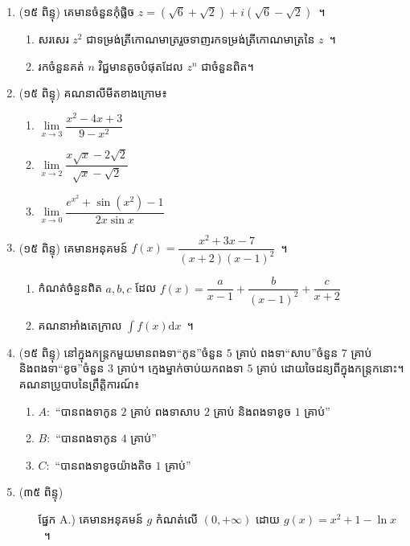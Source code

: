 \documentclass[12pt,a4paper]{article}
\begin{document}
\begin{enumerate}
	\item (១៥ ពិន្ទុ) គេមានចំនួនកុំផ្លិច $ z=(\sqrt{6}+\sqrt{2})+i(\sqrt{6}-\sqrt{2}) $~។
	\begin{enumerate}
		\item សរសេរ $ z^2 $ ជាទម្រង់ត្រីកោណមាត្ររួចទាញរកទម្រង់ត្រីកោណមាត្រនៃ $ z $~។
		\item រកចំនួនគត់ $ n $ វិជ្ជមានតូចបំផុតដែល $ z^n $ ជាចំនួនពិត។
	\end{enumerate}
	\item (១៥ ពិន្ទុ) គណនាលីមីតខាងក្រោម៖
	\begin{multicols}{3}
		\begin{enumerate}
			\item $ \lim\limits_{x\to 3}\dfrac{x^2-4x+3}{9-x^2} $
			\item $ \lim\limits_{x\to 2}\dfrac{x\sqrt{x}-2\sqrt{2}}{\sqrt{x}-\sqrt{2}} $
			\item $ \lim\limits_{x\to 0}\dfrac{e^{x^2}+\sin (x^2)-1}{2x\sin x} $
		\end{enumerate}
	\end{multicols}
	\item (១៥ ពិន្ទុ) គេមានអនុគមន៍ $ f(x)=\dfrac{x^2+3x-7}{(x+2)(x-1)^2} $~។
	\begin{enumerate}
		\item កំណត់ចំនួនពិត $ a,b,c $ ដែល $ f(x)=\dfrac{a}{x-1}+\dfrac{b}{(x-1)^2}+\dfrac{c}{x+2} $
		\item គណនាអាំងតេក្រាល $ \displaystyle\int f(x)\mathrm{d}x $~។
	\end{enumerate}
	\item (១៥ ពិន្ទុ) នៅក្នុងកន្ត្រកមួយមានពងទា``កូន''ចំនួន $ 5 $ គ្រាប់ ពងទា``សាប''ចំនួន $ 7 $ គ្រាប់ និងពងទា``ខូច''ចំនួន $ 3 $ គ្រាប់។ ក្មេងម្នាក់ចាប់យកពងទា $ 5 $ គ្រាប់ ដោយចៃដន្យពីក្នុងកន្ត្រកនោះ។\\
	គណនាប្រូបាបនៃព្រឹត្តិការណ៍៖
	\begin{enumerate}
		\item $ A: $ ``បានពងទាកូន $ 2 $ គ្រាប់ ពងទាសាប $ 2 $ គ្រាប់ និងពងទាខូច $ 1 $ គ្រាប់''
		\item $ B: $ ``បានពងទាកូន $ 4 $ គ្រាប់''
		\item $ C: $ ``បានពងទាខូចយ៉ាងតិច $ 1 $ គ្រាប់''
	\end{enumerate}
	\item (៣៥ ពិន្ទុ) 
	\begin{itemize}
		\item[ផ្នែក A.)] គេមានអនុគមន៍ $ g $ កំណត់លើ $ (0,+\infty) $ ដោយ $ g(x)=x^2+1-\ln x $~។

\end{itemize}
\end{enumerate}
\end{document}
